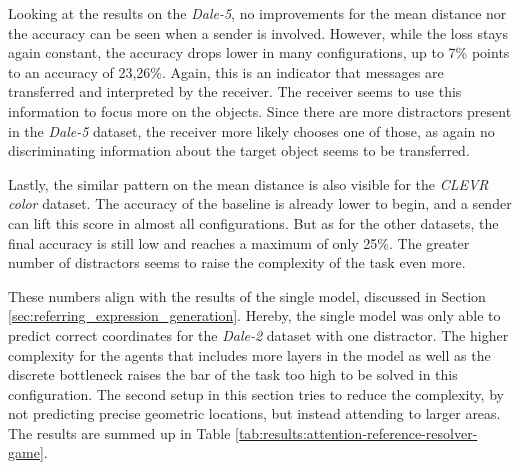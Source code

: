 Looking at the results on the \emph{Dale-5}, no improvements for the mean distance nor the accuracy can be seen when a sender is involved.
However, while the loss stays again constant, the accuracy drops lower in many configurations, up to 7\% points to an accuracy of 23,26\%.
Again, this is an indicator that messages are transferred and interpreted by the receiver.
The receiver seems to use this information to focus more on the objects.
Since there are more distractors present in the \emph{Dale-5} dataset, the receiver more likely chooses one of those, as again no discriminating information about the target object seems to be transferred.

Lastly, the similar pattern on the mean distance is also visible for the \emph{CLEVR color} dataset.
The accuracy of the baseline is already lower to begin, and a sender can lift this score in almost all configurations.
But as for the other datasets, the final accuracy is still low and reaches a maximum of only 25\%.
The greater number of distractors seems to raise the complexity of the task even more.

These numbers align with the results of the single model, discussed in Section \ref{sec:referring_expression_generation}.
Hereby, the single model was only able to predict correct coordinates for the \emph{Dale-2} dataset with one distractor.
The higher complexity for the agents that includes more layers in the model as well as the discrete bottleneck raises the bar of the task too high to be solved in this configuration.
The second setup in this section tries to reduce the complexity, by not predicting precise geometric locations, but instead attending to larger areas.
The results are summed up in Table \ref{tab:results:attention-reference-resolver-game}.

